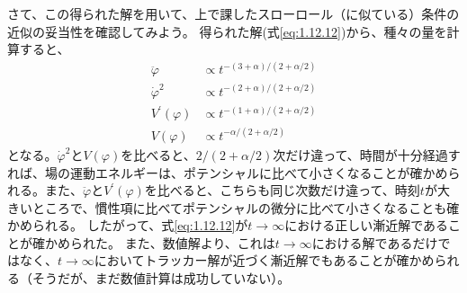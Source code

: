 \documentclass[11pt]{ltjsarticle}
\theoremstyle{plain}
\theoremstyle{break}
\begin{document}
さて、この得られた解を用いて、上で課したスローロール（に似ている）条件の近似の妥当性を確認してみよう。
得られた解(式\eqref{eq:1.12.12})から、種々の量を計算すると、
\begin{align}
  \ddot{\varphi} & \propto t^{-(3+\alpha) /(2+\alpha / 2)} \\
  \dot{\varphi}^{2} & \propto t^{-(2+\alpha) /(2+\alpha / 2)} \\
  V^{\prime}(\varphi) &\propto t^{-(1+\alpha) /(2+\alpha / 2)} \\
  V(\varphi) &\propto t^{-\alpha /(2+\alpha / 2)}
\end{align}%
となる。$\dot{\varphi}^{2}$と$V(\varphi)$を比べると、$2/(2+\alpha/2)$次だけ違って、時間が十分経過すれば、場の運動エネルギーは、ポテンシャルに比べて小さくなることが確かめられる。また、$\ddot{\varphi} $と$V^{\prime}(\varphi) $を比べると、こちらも同じ次数だけ違って、時刻$t$が大きいところで、慣性項に比べてポテンシャルの微分に比べて小さくなることも確かめられる。
したがって、式\eqref{eq:1.12.12}が$t\to \infty$における正しい漸近解であることが確かめられた。
また、数値解より、これは$t \to \infty$における解であるだけではなく、$t \to \infty$においてトラッカー解が近づく漸近解でもあることが確かめられる（そうだが、まだ数値計算は成功していない）。
\end{document}
